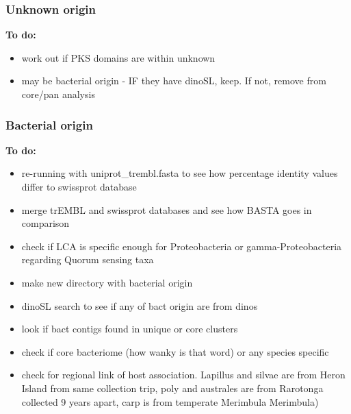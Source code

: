 \documentclass[12pt]{article}
\begin{document}
\subsubsection{Unknown origin}
\textbf{To do:}
\begin{itemize}
\item work out if PKS domains are within unknown
\item may be bacterial origin - IF they have dinoSL, keep. If not, remove from core/pan analysis 
\end{itemize}
\subsubsection{Bacterial origin}
\textbf{To do:}
\begin{itemize}
\item re-running with uniprot\_trembl.fasta to see how percentage identity values differ to swissprot database
\item merge trEMBL and swissprot databases and see how BASTA goes in comparison
\item check if LCA is specific enough for Proteobacteria or gamma-Proteobacteria regarding Quorum sensing taxa
\item make new directory with bacterial origin 
\item dinoSL search to see if any of bact origin are from dinos
\item look if bact contigs found in unique or core clusters
\item check if core bacteriome (how wanky is that word) or any species specific
\item check for regional link of host association. Lapillus and silvae are from Heron Island from same collection trip, poly and australes are from Rarotonga collected 9 years apart, carp is from temperate Merimbula Merimbula)
\end{itemize}
\end{document}
